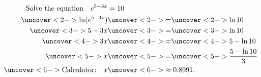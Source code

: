 \begin{frame}
\begin{example}%
\begin{align*}
\text{Solve the equation} \quad e^{5-3x} & =  10 \\
\uncover<2->{\ln (e^{5-3x})} & \uncover<2->{=}  \uncover<2->{\ln 10} \\
\uncover<3->{5-3x} & \uncover<3->{=}  \uncover<3->{\ln 10} \\
\uncover<4->{3x} & \uncover<4->{=}  \uncover<4->{5-\ln 10} \\
\uncover<5->{x} & \uncover<5->{=}  \uncover<5->{\frac{5-\ln 10}{3}} \\
\uncover<6->{\text{Calculator:}\quad x} & \uncover<6->{\approx 0.8991.}
\end{align*}
\end{example}
\end{frame}
